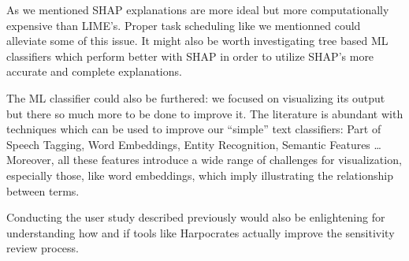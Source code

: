 \documentclass[\version]{l4proj}
\begin{document}
As we mentioned SHAP explanations are more ideal but more computationally expensive than LIME's.
Proper task scheduling like we mentionned could alleviate some of this issue.
It might also be worth investigating tree based ML classifiers which perform better with SHAP in order to utilize SHAP's more accurate and complete explanations.

The ML classifier could also be furthered: we focused on visualizing its output but there so much more to be done to improve it.
The literature is abundant with techniques which can be used to improve our ``simple'' text classifiers: Part of Speech Tagging, Word Embeddings, Entity Recognition, Semantic Features \dots %
Moreover, all these features introduce a wide range of challenges for visualization, especially those, like word embeddings, which imply illustrating the relationship between terms.

Conducting the user study described previously would also be enlightening for understanding how and if tools like Harpocrates actually improve the sensitivity review process.


%
% 
\end{document}
